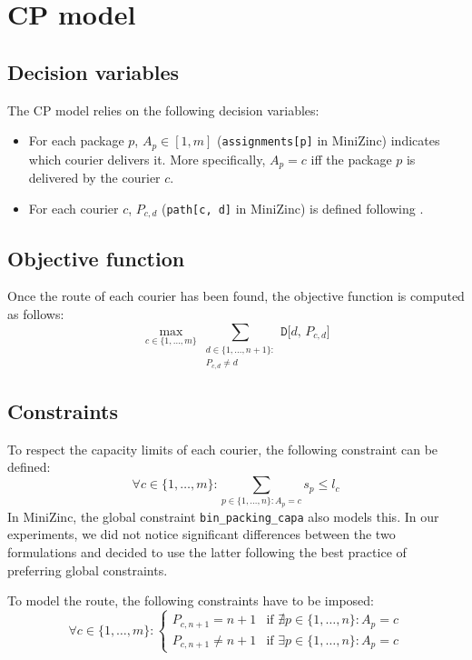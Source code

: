 \section{CP model}


\subsection{Decision variables}

The CP model relies on the following decision variables:
\begin{itemize}
    \item For each package $p$, $A_p \in [1, m]$ (\texttt{assignments[p]} in MiniZinc) indicates which courier delivers it. More specifically, $A_p = c$ iff the package $p$ is delivered by the courier $c$.
    
    \item For each courier $c$, $P_{c, d}$ (\texttt{path[c, d]} in MiniZinc) is defined following .
\end{itemize}



\subsection{Objective function}
Once the route of each courier has been found, the objective function is computed as follows:
\begin{equation}
    \max_{c \in \{ 1, \dots, m \}} \sum_{\substack{d \in \{1, \dots, n+1\}:\\P_{c, d} \neq d}} \texttt{D[$d$, $P_{c, d}$]} 
\end{equation}


\subsection{Constraints}

To respect the capacity limits of each courier, the following constraint can be defined:
\begin{equation}
    \forall c \in \{ 1, \dots, m \}: \sum_{p \in \{1, \dots, n\}: A_p = c} s_p \leq l_c 
\end{equation}
In MiniZinc, the global constraint \texttt{bin\_packing\_capa} also models this. In our experiments, we did not notice significant differences between the two formulations and decided to use the latter following the best practice of preferring global constraints.

To model the route, the following constraints have to be imposed:
\begin{equation}
    \label{eq:cp_constr_route_depot}
    \forall c \in \{ 1, \dots, m \}: 
    \begin{cases}
        P_{c, n+1} = n+1    & \text{if $\nexists p \in \{ 1, \dots, n \}: A_p = c$} \\ 
        P_{c, n+1} \neq n+1 & \text{if $\exists p \in \{ 1, \dots, n \}: A_p = c$} 
    \end{cases}
\end{equation}

